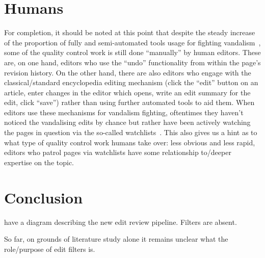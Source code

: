 
\section{Humans}

For completion, it should be noted at this point that despite the steady increase of the proportion of fully and semi-automated tools usage for fighting vandalism~\cite{Geiger2009}, some of the quality control work is still done ``manually'' by human editors.
These are, on one hand, editors who use the ``undo'' functionality from within the page's revision history.
On the other hand, there are also editors who engage with the classical/standard encyclopedia editing mechanism (click the ``edit'' button on an article, enter changes in the editor which opens, write an edit summary for the edit, click ``save'') rather than using further automated tools to aid them.
When editors use these mechanisms for vandalism fighting, oftentimes they haven't noticed the vandalising edits by chance but rather have been actively watching the pages in question via the so-called watchlists~\cite{AstHal2018}.
This also gives us a hint as to what type of quality control work humans take over: less obvious and less rapid, editors who patrol pages via watchlists have some relationship to/deeper expertise on the topic. %

\section{Conclusion}
\cite{AstHal2018} have a diagram describing the new edit review pipeline. Filters are absent.

So far, on grounds of literature study alone it remains unclear what the role/purpose of edit filters is.

